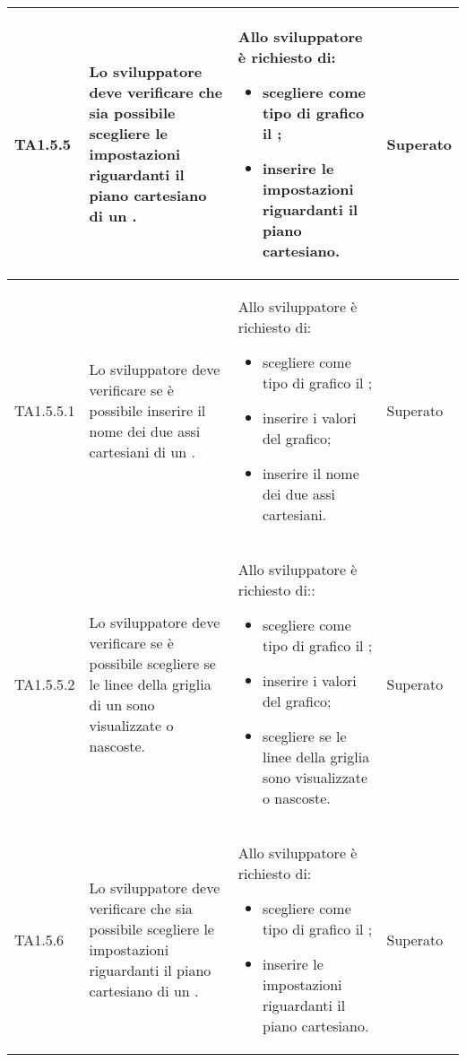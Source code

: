 \begin{longtabu}{| X[0.5] | X | X | X[0.5] |}
	TA1.5.5 & Lo sviluppatore deve verificare che sia possibile scegliere le impostazioni riguardanti il piano cartesiano di un .

		& Allo sviluppatore è richiesto di:
		\begin{itemize}
			\item scegliere come tipo di grafico il ;
			\item inserire le impostazioni riguardanti il piano cartesiano.
		\end{itemize}
& Superato \\ \hline

	TA1.5.5.1 & Lo sviluppatore deve verificare se è possibile inserire il nome dei due assi cartesiani di un .

		& Allo sviluppatore è richiesto di:
		\begin{itemize}
			\item scegliere come tipo di grafico il ;
			\item inserire i valori del grafico;
			\item inserire il nome dei due assi cartesiani.
		\end{itemize}
& Superato \\ \hline

	TA1.5.5.2 & Lo sviluppatore deve verificare se è possibile scegliere se le linee della griglia di un  sono visualizzate o nascoste.

		& Allo sviluppatore è richiesto di::
		\begin{itemize}
			\item scegliere come tipo di grafico il ;
			\item inserire i valori del grafico;
			\item scegliere se le linee della griglia sono visualizzate o nascoste.
		\end{itemize}
& Superato \\ \hline

	TA1.5.6 & Lo sviluppatore deve verificare che sia possibile scegliere le impostazioni riguardanti il piano cartesiano di un .

		& Allo sviluppatore è richiesto di:
		\begin{itemize}
			\item scegliere come tipo di grafico il ;
			\item inserire le impostazioni riguardanti il piano cartesiano.
		\end{itemize}
& Superato \\ \hline


\end{longtabu}
